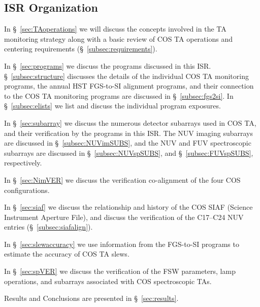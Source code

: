 \subsection{ISR Organization}\label{subsec:org}
In \S~\ref{sec:TAoperations} we will discuss the concepts involved
in the TA monitoring strategy along with a basic review of COS TA operations and
centering requirements (\S~\ref{subsec:requirements}).

In \S~\ref{sec:programs} we discuss the programs discussed in this ISR.
\S~\ref{subsec:structure} discusses the details of the individual COS TA monitoring programs, the annual HST FGS-to-SI alignment programs, and their
connection to the COS TA monitoring programs are discussed in \S~\ref{subsec:fgs2si}.
In \S~\ref{subsec:elists} we list and discuss the individual program exposures.

In \S~\ref{sec:subarray} we discuss the numerous detector subarrays used in COS TA, and their verification by the programs in this ISR.
The NUV imaging subarrays are discussed in \S~\ref{subsec:NUVimSUBS},
and the NUV and FUV spectroscopic subarrays are discussed in  \S~\ref{subsec:NUVspSUBS},
and  \S~\ref{subsec:FUVspSUBS}, respectively.

In \S~\ref{sec:NimVER} we discuss the verification co-alignment of the four COS  configurations.

In \S~\ref{sec:siaf} we discuss the relationship and history of the COS SIAF (Science Instrument Aperture File),
and discuss the verification of the C17--C24 NUV entries (\S~\ref{subsec:siafalign}).

In \S~\ref{sec:slewaccuracy} we use information from the FGS-to-SI programs to estimate the accuracy of COS TA slews.

In \S~\ref{sec:spVER} we discuss the verification of the FSW parameters, lamp operations, and subarrays associated with COS spectroscopic TAs.

Results and Conclusions are presented in \S~\ref{sec:results}.
